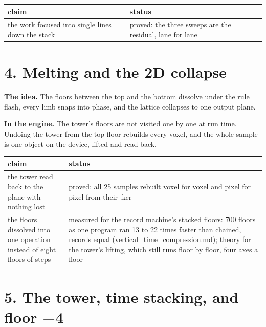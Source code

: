 {\small
\setlength{\tabcolsep}{6pt}
\begin{longtable}{>{\RaggedRight\arraybackslash}p{}>{\RaggedRight\arraybackslash}p{}}
\toprule
claim & status \\
\midrule
\endhead
the work focused into single lines down the stack & proved: the three sweeps are the residual, lane for lane \\
\bottomrule
\end{longtable}
}

\section{\texorpdfstring{4. Melting and the 2D collapse}{4. Melting and the 2D collapse}}

\textbf{The idea.} The floors between the top and the bottom dissolve under the rule flash, every limb snaps into phase, and the lattice collapses to one output plane.

\textbf{In the engine.} The tower's floors are not visited one by one at run time. Undoing the tower from the top floor rebuilds every voxel, and the whole sample is one object on the device, lifted and read back.

{\small
\setlength{\tabcolsep}{6pt}
\begin{longtable}{>{\RaggedRight\arraybackslash}p{}>{\RaggedRight\arraybackslash}p{}}
\toprule
claim & status \\
\midrule
\endhead
the tower read back to the plane with nothing lost & proved: all 25 samples rebuilt voxel for voxel and pixel for pixel from their .kcr \\
the floors dissolved into one operation instead of eight floors of steps & measured for the record machine's stacked floors: 700 floors as one program ran 13 to 22 times faster than chained, records equal (\hyperref[chap:vertical-time-compression]{vertical\_\allowbreak{}time\_\allowbreak{}compression.md}); theory for the tower's lifting, which still runs floor by floor, four axes a floor \\
\bottomrule
\end{longtable}
}

\section{\texorpdfstring{5. The tower, time stacking, and floor −4}{5. The tower, time stacking, and floor −4}}


